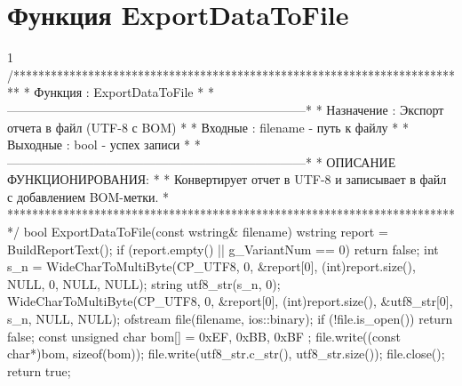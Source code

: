\section{Функция ExportDataToFile}
\footnotesize
\begin{listing}{1}
/*************************************************************************
* Функция       : ExportDataToFile                                       *
*------------------------------------------------------------------------*
* Назначение    : Экспорт отчета в файл (UTF-8 с BOM)                    *
* Входные       : filename - путь к файлу                                *
* Выходные      : bool - успех записи                                    *
*------------------------------------------------------------------------*
* ОПИСАНИЕ ФУНКЦИОНИРОВАНИЯ:                                             *
* Конвертирует отчет в UTF-8 и записывает в файл с добавлением BOM-метки. *
*************************************************************************/
bool ExportDataToFile(const wstring& filename) {
    wstring report = BuildReportText();
    if (report.empty() || g_VariantNum == 0) return false;
    int s_n = WideCharToMultiByte(CP_UTF8, 0, &report[0], 
                                  (int)report.size(), NULL, 0, NULL, NULL);
    string utf8_str(s_n, 0);
    WideCharToMultiByte(CP_UTF8, 0, &report[0], (int)report.size(), 
                        &utf8_str[0], s_n, NULL, NULL);                  
    ofstream file(filename, ios::binary);
    if (!file.is_open()) return false;
    const unsigned char bom[] = { 0xEF, 0xBB, 0xBF };
    file.write((const char*)bom, sizeof(bom)); 
    file.write(utf8_str.c_str(), utf8_str.size()); 
    file.close();
    return true;
}
\end{listing}
\normalsize

\pagebreak

